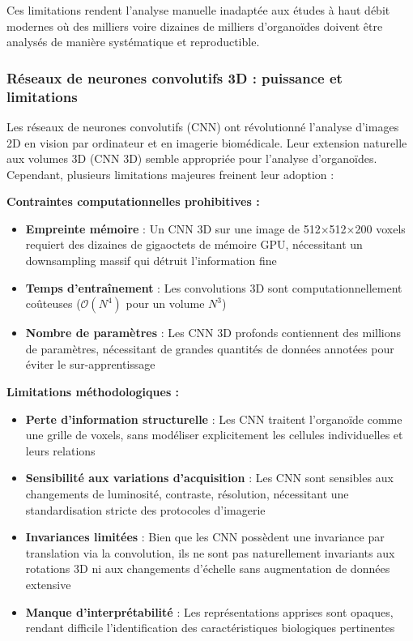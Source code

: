 Ces limitations rendent l'analyse manuelle inadaptée aux études à haut débit modernes où des milliers voire dizaines de milliers d'organoïdes doivent être analysés de manière systématique et reproductible.

\subsubsection{Réseaux de neurones convolutifs 3D : puissance et limitations}

Les réseaux de neurones convolutifs (CNN) ont révolutionné l'analyse d'images 2D en vision par ordinateur et en imagerie biomédicale. Leur extension naturelle aux volumes 3D (CNN 3D) semble appropriée pour l'analyse d'organoïdes. Cependant, plusieurs limitations majeures freinent leur adoption :

\textbf{Contraintes computationnelles prohibitives :}
\begin{itemize}
    \item \textbf{Empreinte mémoire} : Un CNN 3D sur une image de 512×512×200 voxels requiert des dizaines de gigaoctets de mémoire GPU, nécessitant un downsampling massif qui détruit l'information fine
    \item \textbf{Temps d'entraînement} : Les convolutions 3D sont computationnellement coûteuses ($\mathcal{O}(N^4)$ pour un volume $N^3$)
    \item \textbf{Nombre de paramètres} : Les CNN 3D profonds contiennent des millions de paramètres, nécessitant de grandes quantités de données annotées pour éviter le sur-apprentissage
\end{itemize}

\textbf{Limitations méthodologiques :}
\begin{itemize}
    \item \textbf{Perte d'information structurelle} : Les CNN traitent l'organoïde comme une grille de voxels, sans modéliser explicitement les cellules individuelles et leurs relations
    \item \textbf{Sensibilité aux variations d'acquisition} : Les CNN sont sensibles aux changements de luminosité, contraste, résolution, nécessitant une standardisation stricte des protocoles d'imagerie
    \item \textbf{Invariances limitées} : Bien que les CNN possèdent une invariance par translation via la convolution, ils ne sont pas naturellement invariants aux rotations 3D ni aux changements d'échelle sans augmentation de données extensive
    \item \textbf{Manque d'interprétabilité} : Les représentations apprises sont opaques, rendant difficile l'identification des caractéristiques biologiques pertinentes
\end{itemize}

